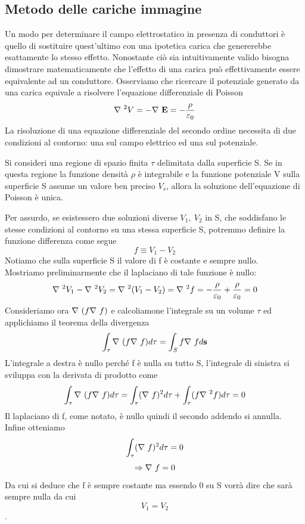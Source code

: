 \documentclass[
10pt, %
a4paper, %
oneside, %
headinclude,footinclude, %
BCOR5mm, %
]{scrartcl}
\begin{document}
\subsection{Metodo delle cariche immagine}
Un modo per determinare il campo elettrostatico in presenza di conduttori è quello di sostituire quest'ultimo con una ipotetica carica che genererebbe esattamente lo stesso effetto. Nonostante ciò sia intuitivamente valido bisogna dimostrare matematicamente che l'effetto di una carica può effettivamente essere equivalente ad un conduttore. Osserviamo che ricercare il potenziale generato da una carica equivale a risolvere l'equazione differenziale di Poisson
\[{\nabla\ }^2 V = -\mathbf{\nabla\ }\mathbf{E}  = -\frac{\rho}{\varepsilon_0}\]
La risoluzione di una equazione differenziale del secondo ordine necessita di due condizioni al contorno: una sul campo elettrico ed una sul potenziale.
\begin{teorema}
	Si consideri una regione di spazio finita  \(\tau\)  delimitata dalla superficie S. Se in questa regione la funzione densità $\rho$ è integrabile e la funzione potenziale V sulla superficie S assume un valore ben preciso \(V_s\), allora la soluzione dell'equazione di Poisson è unica.
\end{teorema}
Per assurdo, se esistessero due soluzioni diverse \(V_1,\  V_2\) in S, che soddisfano le stesse condizioni al contorno su una stessa superficie S, potremmo definire la funzione differenza come segue
\[f\equiv V_1-V_2\]
Notiamo che sulla superficie S il valore di f è costante e sempre nullo.\\
Mostriamo preliminarmente che il laplaciano di tale funzione è nullo:
\[\nabla\ ^2 V_1 - \nabla\ ^2 V_2 = \nabla\ ^2(V_1 - V_2) = \nabla\ ^2 f = -\frac{\rho}{\varepsilon_0}+\frac{\rho}{\varepsilon_0}=0 \]
Consideriamo ora \(\mathbf{\nabla\ }(f\mathbf{\nabla\ }f)\) e calcoliamone l'integrale su un volume $\tau$ ed applichiamo il teorema della divergenza
\[\int_\tau \mathbf{\nabla\ }(f\mathbf{\nabla\ }f)d\tau= \int_Sf\mathbf{\nabla\ }fd\mathbf{s}\]
L'integrale a destra è nullo perché f è nulla su tutto S, l'integrale di sinistra si sviluppa con la derivata di prodotto come
\[\int_\tau \mathbf{\nabla\ }(f\mathbf{\nabla\ }f)d\tau = \int_\tau (\mathbf{\nabla\ }f )^2 d\tau + \int_\tau (f{\nabla\ }^2f)d\tau = 0\]
Il laplaciano di f, come notato, è nullo quindi il secondo addendo si annulla. Infine otteniamo
\[\int_\tau (\mathbf{\nabla\ }f )^2 d\tau=0\]
\[\Rightarrow \mathbf{\nabla\ }f = 0\]
Da cui si deduce che f è sempre costante ma essendo 0 su S vorrà dire che sarà sempre nulla da cui \[V_1 = V_2\]. 
\end{document}
